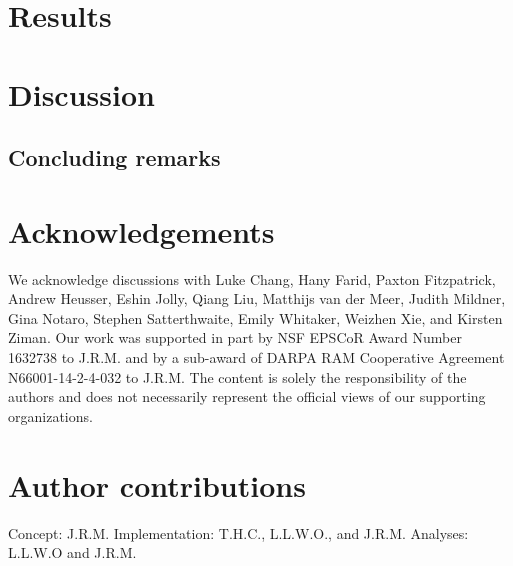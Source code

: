 \documentclass[english]{article}
\begin{document}



\section*{Results}

\section*{Discussion}



\subsection*{Concluding remarks}

\section*{Acknowledgements}
We acknowledge discussions with Luke Chang, Hany Farid, Paxton
Fitzpatrick, Andrew Heusser, Eshin Jolly, Qiang Liu, Matthijs van der
Meer, Judith Mildner, Gina Notaro, Stephen Satterthwaite, Emily
Whitaker, Weizhen Xie, and Kirsten Ziman. Our work was supported in
part by NSF EPSCoR Award Number 1632738 to J.R.M. and by a sub-award
of DARPA RAM Cooperative Agreement N66001-14-2-4-032 to J.R.M.  The
content is solely the responsibility of the authors and does not
necessarily represent the official views of our supporting
organizations.

\section*{Author contributions}
Concept: J.R.M.  Implementation: T.H.C., L.L.W.O., and
J.R.M.  Analyses: L.L.W.O and J.R.M.



\end{document}
